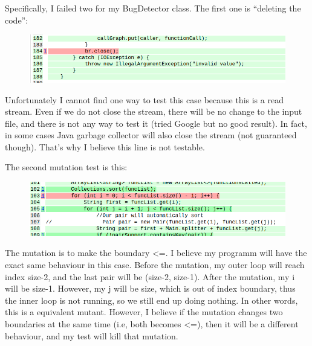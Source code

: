 \documentclass[12pt]{article}
\begin{document}
Specifically, I failed two for my BugDetector class. The first one is ``deleting the code'':

\begin{figure}[H] %
\centering %
\includegraphics[width=1\textwidth]{mutation1.png} %
\end{figure}

Unfortunately I cannot find one way to test this case because this is a read stream. Even if we do not close the stream, there will be no change to the input file, and there is not any way to test it (tried Google but no good result). In fact, in some cases Java garbage collector will also close the stream (not guaranteed though). That's why I believe this line is not testable.

The second mutation test is this:
\begin{figure}[H] %
\centering %
\includegraphics[width=1\textwidth]{mutation2.png} %
\end{figure}

The mutation is to make the boundary <=. I believe my programm will have the exact same behaviour in this case. Before the mutation, my outer loop will reach index size-2, and the last pair will be (size-2, size-1). After the mutation, my i will be size-1. However, my j will be size, which is out of index boundary, thus the inner loop is not running, so we still end up doing nothing. In other words, this is a equivalent mutant. However, I believe if the mutation changes two boundaries at the same time (i.e, both becomes <=), then it will be a different behaviour, and my test will kill that mutation. 
\end{document}
